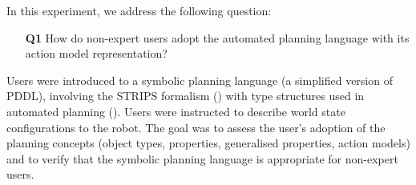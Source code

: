 
In this experiment, we address the following question:

\begin{enumerate}
	\item[\textbf{Q1}] How do non-expert users adopt the automated planning language with its action model representation?
\end{enumerate}

Users were introduced to a symbolic planning language (a simplified version of PDDL), involving the STRIPS formalism (\cite{fikes1971strips}) with type structures used in automated planning ().
Users were instructed to describe world state configurations to the robot.
The goal was to assess the user's adoption of the planning concepts (\ie object types, properties, generalised properties, action models) and to verify that the symbolic planning language is appropriate for non-expert users.

